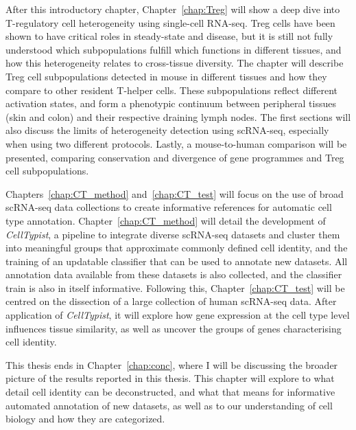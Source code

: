 After this introductory chapter, Chapter~\ref{chap:Treg} will show a deep dive into T-regulatory cell heterogeneity using single-cell RNA-seq. Treg cells have been shown to have critical roles in steady-state and disease, but it is still not fully understood which subpopulations fulfill which functions in different tissues, and how this heterogeneity relates to cross-tissue diversity. The chapter will describe Treg cell subpopulations detected in mouse in different tissues and how they compare to other resident T-helper cells. These subpopulations reflect different activation states, and form a phenotypic continuum between peripheral tissues (skin and colon) and their respective draining lymph nodes. The first sections will also discuss the limits of heterogeneity detection using scRNA-seq, especially when using two different protocols. Lastly, a mouse-to-human comparison will be presented, comparing conservation and divergence of gene programmes and Treg cell subpopulations.

Chapters~\ref{chap:CT_method} and~\ref{chap:CT_test} will focus on the use of broad scRNA-seq data collections to create informative references for automatic cell type annotation. Chapter~\ref{chap:CT_method} will detail the development of \textit{CellTypist}, a pipeline to integrate diverse scRNA-seq datasets and cluster them into meaningful groups that approximate commonly defined cell identity, and the training of an updatable classifier that can be used to annotate new datasets. All annotation data available from these datasets is also collected, and the classifier train is also in itself informative. Following this, Chapter~\ref{chap:CT_test} will be centred on the dissection of a large collection of human scRNA-seq data. After application of \textit{CellTypist}, it will explore how gene expression at the cell type level influences tissue similarity, as well as uncover the groups of genes characterising cell identity.

This thesis ends in Chapter~\ref{chap:conc}, where I will be discussing the broader picture of the results reported in this thesis. This chapter will explore to what detail cell identity can be deconstructed, and what that means for informative automated annotation of new datasets, as well as to our understanding of cell biology and how they are categorized. 